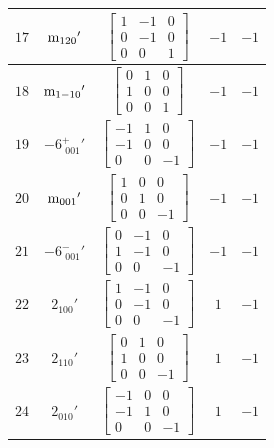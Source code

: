 \documentclass[fleqn,8pt]{jsarticle}
\begin{document}
\begin{longtable}{ccccc}
$ 17 $ & $ {\rm m}_{120}{}' $ & $ \begin{bmatrix} 1 & -1 & 0 \\ 0 & -1 & 0 \\ 0 & 0 & 1 \end{bmatrix} $ & $ -1 $ & $ -1 $ \\ \hline
$ 18 $ & $ {\rm m}_{1-10}{}' $ & $ \begin{bmatrix} 0 & 1 & 0 \\ 1 & 0 & 0 \\ 0 & 0 & 1 \end{bmatrix} $ & $ -1 $ & $ -1 $ \\ \hline
$ 19 $ & $ -6^{+}_{\,\,001}{}' $ & $ \begin{bmatrix} -1 & 1 & 0 \\ -1 & 0 & 0 \\ 0 & 0 & -1 \end{bmatrix} $ & $ -1 $ & $ -1 $ \\ \hline
$ 20 $ & $ {\rm m}_{001}{}' $ & $ \begin{bmatrix} 1 & 0 & 0 \\ 0 & 1 & 0 \\ 0 & 0 & -1 \end{bmatrix} $ & $ -1 $ & $ -1 $ \\ \hline
$ 21 $ & $ -6^{-}_{\,\,001}{}' $ & $ \begin{bmatrix} 0 & -1 & 0 \\ 1 & -1 & 0 \\ 0 & 0 & -1 \end{bmatrix} $ & $ -1 $ & $ -1 $ \\ \hline
$ 22 $ & $ 2{}_{100}{}' $ & $ \begin{bmatrix} 1 & -1 & 0 \\ 0 & -1 & 0 \\ 0 & 0 & -1 \end{bmatrix} $ & $ 1 $ & $ -1 $ \\ \hline
$ 23 $ & $ 2{}_{110}{}' $ & $ \begin{bmatrix} 0 & 1 & 0 \\ 1 & 0 & 0 \\ 0 & 0 & -1 \end{bmatrix} $ & $ 1 $ & $ -1 $ \\ \hline
$ 24 $ & $ 2{}_{010}{}' $ & $ \begin{bmatrix} -1 & 0 & 0 \\ -1 & 1 & 0 \\ 0 & 0 & -1 \end{bmatrix} $ & $ 1 $ & $ -1 $ \\
\end{longtable}
\end{document}
